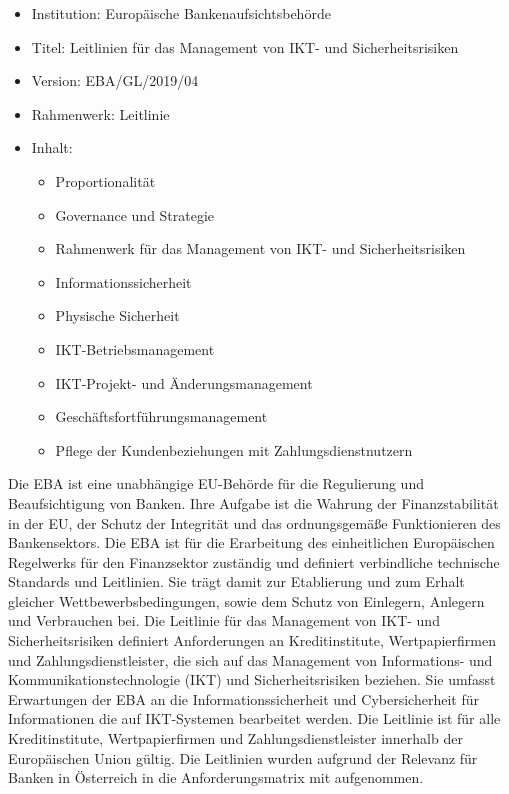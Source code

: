 \begin{itemize}
    \item Institution: Europäische Bankenaufsichtsbehörde
    \item Titel: Leitlinien für das Management von IKT- und Sicherheitsrisiken \autocite{eba_final_draft}
    \item Version: EBA/GL/2019/04
    \item Rahmenwerk: Leitlinie
    \item Inhalt: 
    \begin{itemize}
        \item Proportionalität 
        \item Governance und Strategie 
        \item Rahmenwerk für das Management von IKT- und Sicherheitsrisiken
        \item Informationssicherheit 
        \item Physische Sicherheit 
        \item IKT-Betriebsmanagement 
        \item IKT-Projekt- und Änderungsmanagement 
        \item Geschäftsfortführungsmanagement 
        \item Pflege der Kundenbeziehungen mit Zahlungsdienstnutzern
    \end{itemize}
\end{itemize}
\bigbreak
Die EBA ist eine unabhängige EU-Behörde für die Regulierung und Beaufsichtigung von Banken. Ihre Aufgabe ist die Wahrung der Finanzstabilität in der EU, der Schutz der Integrität und das ordnungsgemäße Funktionieren des Bankensektors. Die EBA ist für die Erarbeitung des einheitlichen Europäischen Regelwerks für den Finanzsektor zuständig und definiert verbindliche technische Standards und Leitlinien. Sie trägt damit zur Etablierung und zum Erhalt gleicher Wettbewerbsbedingungen, sowie dem Schutz von Einlegern, Anlegern und Verbrauchen bei. \autocite{EBA} 
\bigbreak
Die \glqq{}Leitlinie für das Management von IKT- und Sicherheitsrisiken\grqq{} definiert Anforderungen an Kreditinstitute, Wertpapierfirmen und Zahlungsdienstleister, die sich auf das Management von Informations- und Kommunikationstechnologie (IKT) und Sicherheitsrisiken beziehen. Sie umfasst Erwartungen der EBA an die Informationssicherheit und Cybersicherheit für Informationen die auf IKT-Systemen bearbeitet werden. 
Die Leitlinie ist für alle Kreditinstitute, Wertpapierfirmen und Zahlungsdienstleister innerhalb der Europäischen Union gültig. Die Leitlinien wurden aufgrund der Relevanz für Banken in Österreich in die Anforderungsmatrix mit aufgenommen. \autocite{PFR}

